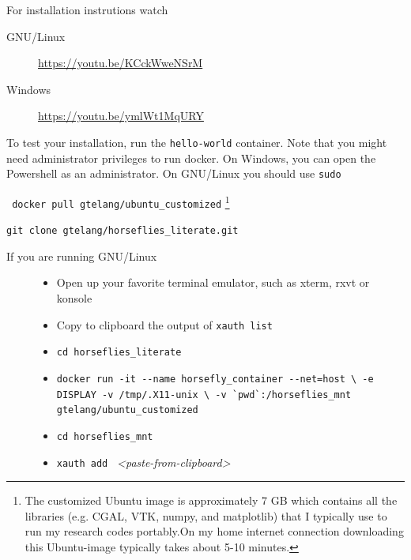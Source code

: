 \documentclass[11.5pt]{report}
\begin{document}
\begin{alphalist}
\item {} For installation instrutions watch
  \begin{description}
    \item[GNU/Linux]  \url{https://youtu.be/KCckWweNSrM}
    \item[Windows]    \url{https://youtu.be/ymlWt1MqURY}
  \end{description}
  To test your installation, run the \verb|hello-world| container. Note that you might 
  need administrator privileges to run docker. On Windows, you can open the Powershell 
  as an administrator. On GNU/Linux you should use \verb|sudo|
\item {} \verb| docker pull gtelang/ubuntu_customized| \footnote{The customized Ubuntu image is approximately
  7 GB which contains all the libraries (e.g. CGAL, VTK, numpy, and matplotlib) that I typically use to run 
  my research codes portably.On my home internet connection downloading this Ubuntu-image typically takes about 5-10 minutes. }
\item {} \verb|git clone gtelang/horseflies_literate.git|
\item {} 
\begin{description}
\item[If you are running GNU/Linux] 
\begin{itemize}
   \item Open up your favorite terminal emulator, such as xterm, rxvt or konsole
   \item Copy to clipboard the output of \texttt{xauth list}
   \item \verb|cd horseflies_literate|
   \item \texttt{docker run -it -\phantom{}-name horsefly\_container -\phantom{}-net=host \textbackslash \newline 
                -e DISPLAY -v /tmp/.X11-unix \textbackslash                                              \newline 
                -v  \`{}pwd\`{}:/horseflies\_mnt gtelang/ubuntu\_customized}
   \item \verb|cd horseflies_mnt| 
   \item \verb|xauth add | \textit{<paste-from-clipboard>}
\end{itemize}


\end{description}
\end{alphalist}
\end{document}
